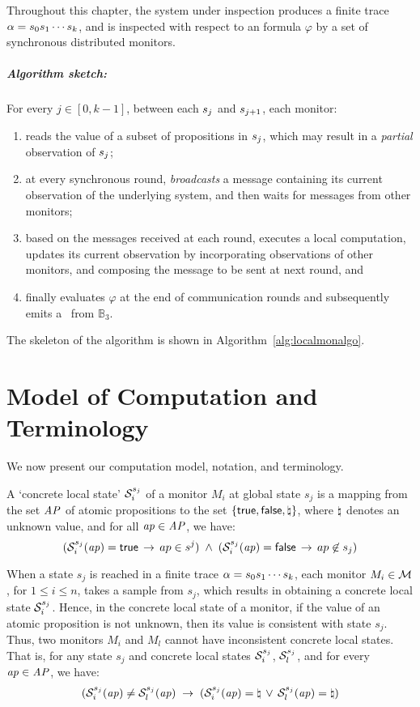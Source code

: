 Throughout this chapter, the system under inspection produces a finite trace 
$\alpha = s_0s_1\cdots s_k$, and is inspected with respect to 
an \LTL formula $\varphi$ by a set of synchronous distributed monitors. 

\subparagraph{Algorithm sketch:} For every $j\in [0,k-1]$, between each 
$s_j$ and $s_{j+1}$, each monitor:

\begin{enumerate}
\item reads the value of a subset of propositions in $s_j$, which may 
result in a {\em partial} observation of $s_j$; 

\item at every synchronous round, {\em broadcasts} a message containing its 
current observation of the underlying system, and then waits for messages from 
other monitors;

\item based on the messages received at each round, executes a local 
computation, updates its current observation by incorporating observations of 
other monitors, and composing the message to be sent at next round, and

\item finally evaluates $\varphi$ at the end of communication rounds and 
subsequently emits a \truthvalue~from $\mathbb{B}_3$. 
\end{enumerate}

The skeleton of the algorithm is shown in Algorithm~\ref{alg:localmonalgo}.


\section{Model of Computation and Terminology}
\label{sec:modelterm}
We now present our computation model, notation, and terminology.

\begin{definition}
\label{def:concretestate}
A `concrete local state' $\mathcal{S}_i^{s_j}$ of a monitor $M_i$ at global 
state $s_j$ is a mapping from the set $\mathit{AP}$ of atomic propositions to the set 
$\{\mathsf{true}, \mathsf{false}, \natural\}$, where $\natural$ denotes an unknown value, and for all 
$\mathit{ap} \in \mathit{AP}$, we have:
$$(\mathcal{S}_i^{s_j}(\mathit{ap}) = \mathsf{true} \, \rightarrow \, ap \in s^j) \; \wedge \; 
(\mathcal{S}_i^{s_j}(\mathit{ap}) = \mathsf{false} \, \rightarrow \, ap \not \in s_j)$$ 
\end{definition}

When a state $s_j$ is reached in a finite trace $\alpha 
=s_0s_1\cdots s_k$, each monitor $M_i \in \mathcal{M}$, for $1 \leq 
i \leq n$, takes a sample from $s_j$, which results in obtaining a concrete 
local state $\mathcal{S}_i^{s_j}$. Hence, in the concrete local state of a monitor, 
if the value of an atomic proposition is not unknown, then its value is 
consistent with state $s_j$. Thus, two monitors $M_i$ and $M_l$ cannot have 
inconsistent concrete local states. That is, for any state $s_j$ and concrete 
local states $\mathcal{S}_i^{s_j}$, $\mathcal{S}_l^{s_j}$, and for every $\mathit{ap} \in \mathit{AP}$, 
we have:
$$(\mathcal{S}_i^{s_j}(\mathit{ap}) \neq \mathcal{S}_l^{s_j}(\mathit{ap}) \;  \rightarrow \; 
(\mathcal{S}_i^{s_j}(\mathit{ap}) = \natural \, \vee \, \mathcal{S}_l^{s_j}(\mathit{ap}) = \natural)$$

